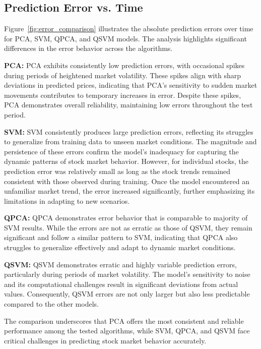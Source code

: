 \documentclass[journal]{IEEEtran}
\begin{document}
\subsection{Prediction Error vs. Time}

Figure~\ref{fig:error_comparison} illustrates the absolute prediction errors over time for PCA, SVM, QPCA, and QSVM models. The analysis highlights significant differences in the error behavior across the algorithms.

\textbf{PCA:} PCA exhibits consistently low prediction errors, with occasional spikes during periods of heightened market volatility. These spikes align with sharp deviations in predicted prices, indicating that PCA's sensitivity to sudden market movements contributes to temporary increases in error. Despite these spikes, PCA demonstrates overall reliability, maintaining low errors throughout the test period.

\textbf{SVM:} SVM consistently produces large prediction errors, reflecting its struggles to generalize from training data to unseen market conditions. The magnitude and persistence of these errors confirm the model’s inadequacy for capturing the dynamic patterns of stock market behavior. However, for individual stocks, the prediction error was relatively small as long as the stock trends remained consistent with those observed during training. Once the model encountered an unfamiliar market trend, the error increased significantly, further emphasizing its limitations in adapting to new scenarios.


\textbf{QPCA:} QPCA demonstrates error behavior that is comparable to majority of SVM results. While the errors are not as erratic as those of QSVM, they remain significant and follow a similar pattern to SVM, indicating that QPCA also struggles to generalize effectively and adapt to dynamic market conditions.

\textbf{QSVM:} QSVM demonstrates erratic and highly variable prediction errors, particularly during periods of market volatility. The model's sensitivity to noise and its computational challenges result in significant deviations from actual values. Consequently, QSVM errors are not only larger but also less predictable compared to the other models.

The comparison underscores that PCA offers the most consistent and reliable performance among the tested algorithms, while SVM, QPCA, and QSVM face critical challenges in predicting stock market behavior accurately.
\end{document}
